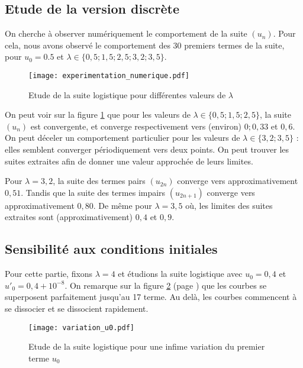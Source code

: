 \subsection{Etude de la version discrète}
\label{section:version_discrete}
On cherche à observer numériquement le comportement de la suite $(u_n)$. Pour cela, nous avons observé le comportement des $30$ premiers termes de la suite, pour $u_0 = 0.5$ et $\lambda\in\{0,5; 1,5; 2,5; 3,2; 3,5\}$.

\begin{figure}[!ht]
    \begin{center}
        \texttt{[image: experimentation\_numerique.pdf]}
    \end{center}
    \caption{\label{fig:etude_lambdas}Etude de la suite logistique pour différentes valeurs de $\lambda$}
\end{figure}
On peut voir sur la figure \ref{fig:etude_lambdas} que pour les valeurs de $\lambda\in\{0,5; 1,5; 2,5\}$, la suite $(u_n)$ est convergente, et converge respectivement vers (environ) $0; 0,33$ et $0,6$. On peut déceler un comportement particulier pour les valeurs de $\lambda \in\{3,2; 3,5\}$ : elles semblent converger périodiquement vers deux points. On peut trouver les suites extraites afin de donner une valeur approchée de leurs limites.

Pour $\lambda = 3,2$, la suite des termes pairs $(u_{2n})$ converge vers approximativement $0,51$. Tandis que la suite des termes impairs $(u_{2n+1})$ converge vers approximativement $0,80$. De même pour $\lambda = 3,5$ où, les limites des suites extraites sont (approximativement) $0,4$ et $0,9$.

\subsection{Sensibilité aux conditions initiales}
Pour cette partie, fixons $\lambda = 4$ et étudions la suite logistique avec $u_0 = 0,4$ et $u'_0 = 0,4 + 10^{-8}$. On remarque sur la figure \ref{fig:etude_u0} (page \pageref{fig:etude_u0}) que les courbes se superposent parfaitement jusqu'au 17\ieme{} terme. Au delà, les courbes commencent à se dissocier et se dissocient rapidement.

\begin{figure}[!ht]
    \begin{center}
        \texttt{[image: variation\_u0.pdf]}
    \end{center}
    \caption{\label{fig:etude_u0}Etude de la suite logistique pour une infime variation du premier terme $u_0$}
\end{figure}

